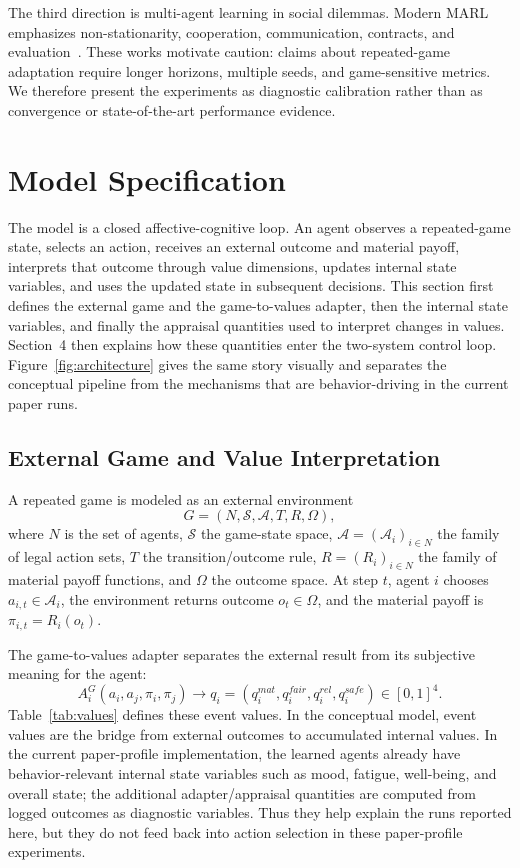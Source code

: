 \documentclass[runningheads]{llncs}
\begin{document}
The third direction is multi-agent learning in social dilemmas. Modern MARL emphasizes non-stationarity, cooperation, communication, contracts, and evaluation~\cite{gronauer2022marl,zhu2024communication,ning2024survey,mu2024socialdilemmas,willis2024reward,haupt2024contracts,su2026iterated}. These works motivate caution: claims about repeated-game adaptation require longer horizons, multiple seeds, and game-sensitive metrics. We therefore present the experiments as diagnostic calibration rather than as convergence or state-of-the-art performance evidence.

\section{Model Specification}

The model is a closed affective-cognitive loop. An agent observes a repeated-game state, selects an action, receives an external outcome and material payoff, interprets that outcome through value dimensions, updates internal state variables, and uses the updated state in subsequent decisions. This section first defines the external game and the game-to-values adapter, then the internal state variables, and finally the appraisal quantities used to interpret changes in values. Section~4 then explains how these quantities enter the two-system control loop. Figure~\ref{fig:architecture} gives the same story visually and separates the conceptual pipeline from the mechanisms that are behavior-driving in the current paper runs.

\subsection{External Game and Value Interpretation}

A repeated game is modeled as an external environment
\[
G=(N,\mathcal{S},\mathcal{A},T,R,\Omega),
\]
where $N$ is the set of agents, $\mathcal{S}$ the game-state space, $\mathcal{A}=(\mathcal{A}_i)_{i\in N}$ the family of legal action sets, $T$ the transition/outcome rule, $R=(R_i)_{i\in N}$ the family of material payoff functions, and $\Omega$ the outcome space. At step $t$, agent $i$ chooses $a_{i,t}\in\mathcal{A}_i$, the environment returns outcome $o_t\in\Omega$, and the material payoff is $\pi_{i,t}=R_i(o_t)$.

The game-to-values adapter separates the external result from its subjective meaning for the agent:
\[
A_i^G(a_i,a_j,\pi_i,\pi_j)\rightarrow q_i=(q_i^{mat},q_i^{fair},q_i^{rel},q_i^{safe})\in[0,1]^4.
\]
Table~\ref{tab:values} defines these event values. In the conceptual model, event values are the bridge from external outcomes to accumulated internal values. In the current paper-profile implementation, the learned agents already have behavior-relevant internal state variables such as mood, fatigue, well-being, and overall state; the additional adapter/appraisal quantities are computed from logged outcomes as diagnostic variables. Thus they help explain the runs reported here, but they do not feed back into action selection in these paper-profile experiments.
\end{document}
